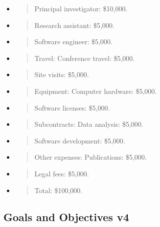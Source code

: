 \begin{itemize}
\item
  \begin{quote}
  Principal investigator: \$10,000.
  \end{quote}
\item
  \begin{quote}
  Research assistant: \$5,000.
  \end{quote}
\item
  \begin{quote}
  Software engineer: \$5,000.
  \end{quote}
\item
  \begin{quote}
  Travel: Conference travel: \$5,000.
  \end{quote}
\item
  \begin{quote}
  Site visits: \$5,000.
  \end{quote}
\item
  \begin{quote}
  Equipment: Computer hardware: \$5,000.
  \end{quote}
\item
  \begin{quote}
  Software licenses: \$5,000.
  \end{quote}
\item
  \begin{quote}
  Subcontracts: Data analysis: \$5,000.
  \end{quote}
\item
  \begin{quote}
  Software development: \$5,000.
  \end{quote}
\item
  \begin{quote}
  Other expenses: Publications: \$5,000.
  \end{quote}
\item
  \begin{quote}
  Legal fees: \$5,000.
  \end{quote}
\item
  \begin{quote}
  Total: \$100,000.
  \end{quote}
\end{itemize}

\hypertarget{goals-and-objectives-v4}{%
\subsection{Goals and Objectives v4}\label{goals-and-objectives-v4}}

